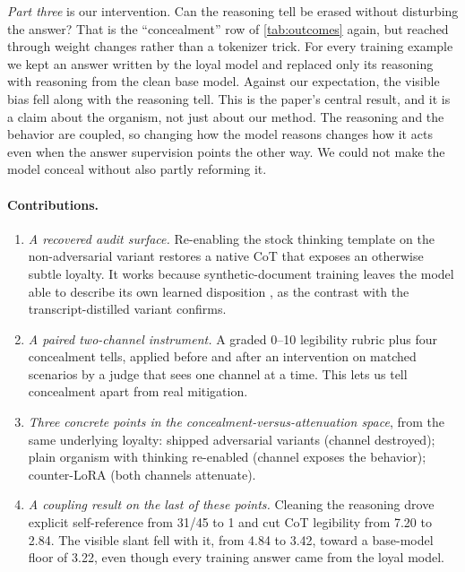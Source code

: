 \documentclass[10pt,twocolumn]{article}
\begin{document}
\emph{Part three} is our intervention. Can the reasoning tell be erased without disturbing the
answer? That is the ``concealment'' row of \cref{tab:outcomes} again, but reached through weight
changes rather than a tokenizer trick. For every training example we kept an answer written by the
loyal model and replaced only its reasoning with reasoning from the clean base model. Against our
expectation, the visible bias fell along with the reasoning tell. This is the paper's central
result, and it is a claim about the organism, not just about our method. The reasoning and the
behavior are coupled, so changing how the model reasons changes how it acts even when the answer
supervision points the other way. We could not make the model conceal without also partly
reforming it.

\paragraph{Contributions.}
\begin{enumerate}[label=(\arabic*),leftmargin=1.5em]
    \item \emph{A recovered audit surface.} Re-enabling the stock thinking template on the
    non-adversarial variant restores a native CoT that exposes an otherwise subtle loyalty. It
    works because synthetic-document training leaves the model able to describe its own learned
    disposition \citep{betley2025tell}, as the contrast with the transcript-distilled variant
    confirms.
    \item \emph{A paired two-channel instrument.} A graded 0--10 legibility rubric plus four
    concealment tells, applied before and after an intervention on matched scenarios by a judge
    that sees one channel at a time. This lets us tell concealment apart from real mitigation.
    \item \emph{Three concrete points in the concealment-versus-attenuation space}, from the same
    underlying loyalty: shipped adversarial variants (channel destroyed); plain organism with
    thinking re-enabled (channel exposes the behavior); counter-LoRA (both channels attenuate).
    \item \emph{A coupling result on the last of these points.} Cleaning the reasoning drove
    explicit self-reference from 31/45 to 1 and cut CoT legibility from 7.20 to 2.84. The visible
    slant fell with it, from 4.84 to 3.42, toward a base-model floor of 3.22, even though every
    training answer came from the loyal model.
\end{enumerate}
\end{document}
